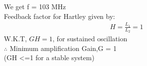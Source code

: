 \begin{enumerate}[label=\thesubsection.\arabic*.,ref=\thesubsection.\theenumi]
We get f = 103 MHz\\
Feedback factor for Hartley given by:
\begin{align}
H =\frac{L_1}{L_2}= 1
\end{align}
W.K.T, $GH = 1$, for sustained oscillation \\
$\therefore$ Minimum amplification Gain,G = 1\\ (GH <=1 for a stable system) \\
\end{enumerate}
